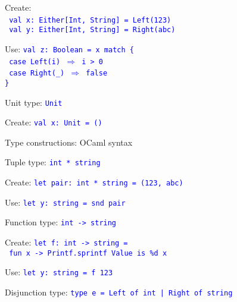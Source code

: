 Create:\\
 \texttt{\textcolor{blue}{\footnotesize{}\ val x:\ Either{[}Int,
String{]} = Left(123)}}~\\
\texttt{\textcolor{blue}{\footnotesize{} val y:\ Either{[}Int, String{]}
= Right(\textquotedbl abc\textquotedbl )}}{\footnotesize\par}

Use: \texttt{\textcolor{blue}{\footnotesize{}val z:\ Boolean = x
match \{}}~\\
\texttt{\textcolor{blue}{\footnotesize{} case Left(i) $\Rightarrow$
i > 0}}~\\
\texttt{\textcolor{blue}{\footnotesize{} case Right(\_) $\Rightarrow$
false}}~\\
\texttt{\textcolor{blue}{\footnotesize{}\}}}{\footnotesize\par}

Unit type: \texttt{\textcolor{blue}{\footnotesize{}Unit}}{\footnotesize\par}

Create: \texttt{\textcolor{blue}{\footnotesize{}val x:\ Unit = ()}}{\footnotesize\par}

Type constructions: OCaml syntax

Tuple type: \texttt{\textcolor{blue}{\footnotesize{}int {*} string}}{\footnotesize\par}

Create: \texttt{\textcolor{blue}{\footnotesize{}let pair:\ int {*}
string = (123, \textquotedbl abc\textquotedbl )}} 

Use: \texttt{\textcolor{blue}{\footnotesize{}let y:\ string = snd
pair}}{\footnotesize\par}

Function type: \texttt{\textcolor{blue}{\footnotesize{}int -> string}}{\footnotesize\par}

Create: \texttt{\textcolor{blue}{\footnotesize{}let f:\ int -> string
=}}~\\
\texttt{\textcolor{blue}{\footnotesize{} fun x -> Printf.sprintf \textquotedbl Value
is \%d\textquotedbl{} x}} 

Use: \texttt{\textcolor{blue}{\footnotesize{}let y:\ string = f 123}}{\footnotesize\par}

Disjunction type: \texttt{\textcolor{blue}{\footnotesize{}type e =
Left of int | Right of string}}{\footnotesize\par}

